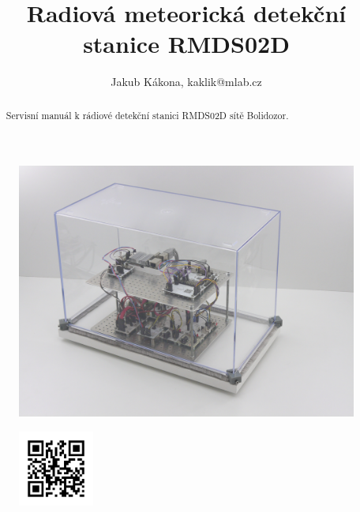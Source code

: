 \documentclass[12pt,a4paper,oneside]{article}
\begin{document}
\title{Radiová meteorická detekční stanice RMDS02D}
\author{Jakub Kákona, kaklik@mlab.cz }
\maketitle

\begin{abstract}
Servisní manuál k rádiové detekční stanici RMDS02D sítě Bolidozor.
\end{abstract}

\begin{figure} [htbp]
\begin{center}
\includegraphics [width=120mm] {./img/RMDS02D_showcase1.JPG} 
\end{center}
\end{figure}

\begin{figure} [b]
\includegraphics [width=25mm] {./img/Bolidozor_web_QR.png} 
\end{figure}

\newpage
\tableofcontents
\end{document}
